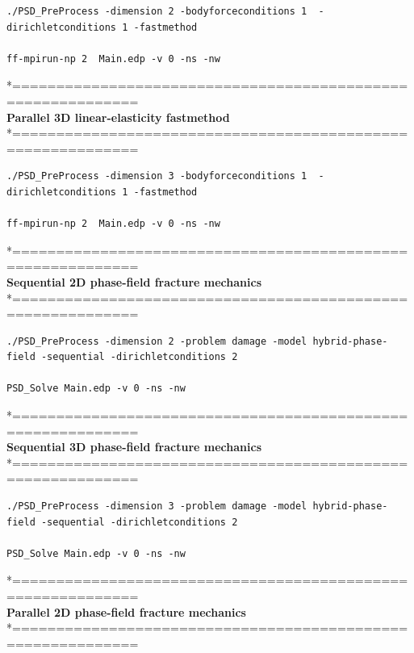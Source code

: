 \begin{lstlisting}[style=Linux]
./PSD_PreProcess -dimension 2 -bodyforceconditions 1  -dirichletconditions 1 -fastmethod  

ff-mpirun-np 2  Main.edp -v 0 -ns -nw	
\end{lstlisting}
*============================================================\\
\textbf{ Parallel 3D linear-elasticity     fastmethod }             \\
*============================================================\\
	
\begin{lstlisting}[style=Linux]
./PSD_PreProcess -dimension 3 -bodyforceconditions 1  -dirichletconditions 1 -fastmethod  

ff-mpirun-np 2  Main.edp -v 0 -ns -nw
\end{lstlisting}



*============================================================\\
\textbf{ Sequential  2D phase-field fracture mechanics }\\
*============================================================\\
\begin{lstlisting}[style=Linux]
./PSD_PreProcess -dimension 2 -problem damage -model hybrid-phase-field -sequential -dirichletconditions 2   

PSD_Solve Main.edp -v 0 -ns -nw   
\end{lstlisting}
*============================================================\\
\textbf{ Sequential  3D phase-field fracture mechanics}\\ 
*============================================================\\

\begin{lstlisting}[style=Linux]
./PSD_PreProcess -dimension 3 -problem damage -model hybrid-phase-field -sequential -dirichletconditions 2   

PSD_Solve Main.edp -v 0 -ns -nw   
\end{lstlisting}
*============================================================\\
\textbf{ Parallel 2D phase-field fracture mechanics} \\
*============================================================\\

